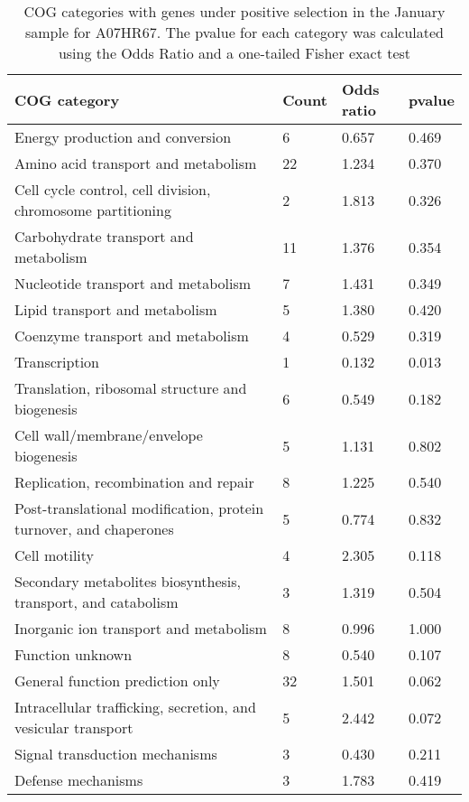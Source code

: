 \begin{table}[]
\footnotesize 
	\tabcolsep=0.11cm 
\caption{COG categories with genes under positive selection in the January sample for A07HR67. The pvalue for each category was calculated using the Odds Ratio and a one-tailed Fisher exact test} 
\begin{tabularx}{\textwidth}{L{6cm}R{2cm}R{2cm}R{2cm}} 
\hline 
\textbf{COG category} & \textbf{Count} & \textbf{Odds ratio} & \textbf{pvalue} \\ 
\hline 
Energy production and conversion & 6 & 0.657 & 0.469 \\ 
Amino acid transport and metabolism & 22 & 1.234 & 0.370 \\ 
Cell cycle control, cell division, chromosome partitioning & 2 & 1.813 & 0.326 \\ 
Carbohydrate transport and metabolism & 11 & 1.376 & 0.354 \\ 
Nucleotide transport and metabolism & 7 & 1.431 & 0.349 \\ 
Lipid transport and metabolism & 5 & 1.380 & 0.420 \\ 
Coenzyme transport and metabolism & 4 & 0.529 & 0.319 \\ 
Transcription & 1 & 0.132 & 0.013 \\ 
Translation, ribosomal structure and biogenesis & 6 & 0.549 & 0.182 \\ 
Cell wall/membrane/envelope biogenesis & 5 & 1.131 & 0.802 \\ 
Replication, recombination and repair & 8 & 1.225 & 0.540 \\ 
Post-translational modification, protein turnover, and chaperones & 5 & 0.774 & 0.832 \\ 
Cell motility & 4 & 2.305 & 0.118 \\ 
Secondary metabolites biosynthesis, transport, and catabolism & 3 & 1.319 & 0.504 \\ 
Inorganic ion transport and metabolism & 8 & 0.996 & 1.000 \\ 
Function unknown & 8 & 0.540 & 0.107 \\ 
General function prediction only & 32 & 1.501 & 0.062 \\ 
Intracellular trafficking, secretion, and vesicular transport & 5 & 2.442 & 0.072 \\ 
Signal transduction mechanisms & 3 & 0.430 & 0.211 \\ 
Defense mechanisms & 3 & 1.783 & 0.419 \\ 
\end{tabularx} 
\label{January_COG_Selection_A07HR67} 
 \end{table} 

